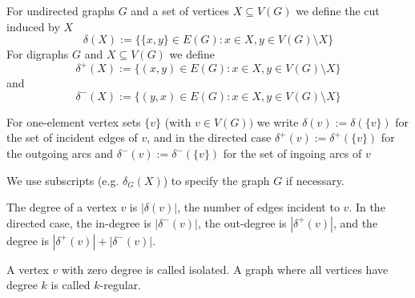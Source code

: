 % 
\begin{definition}
For undirected graphs $G$ and a set of vertices $X \subseteq V(G)$ we define the cut induced by $X$
$$\delta(X) := \{\{x, y\} \in E(G) : x \in X , y \in V(G) \setminus X\}$$
For digraphs $G$ and $X \subseteq V(G)$ we define 
$$\delta^+(X) := \{(x, y) \in E(G) : x \in X , y \in V(G) \setminus X\}$$ and
$$\delta^-(X) := \{(y, x) \in E(G) : x \in X , y \in V(G) \setminus X\}$$
 
For one-element vertex sets $\{v\}$ (with $v \in V(G))$ we write $\delta(v) :=\delta(\{v\})$ for the set of incident 
edges of $v$, and in the directed case 
$ \delta^+(v) := \delta^+(\{v\})$ for the outgoing arcs and $\delta^-(v) := \delta^-(\{v\})$ for the set of ingoing 
arcs of $v$
\end{definition}
We use subscripts (e.g. $\delta_G(X)$) to specify the graph $G$ if necessary.
\begin{definition}
The degree of a vertex $v$ is $|\delta(v)|$, the number of edges incident to $v$. In the directed 
case, the in-degree is $|\delta^-(v)|$, the out-degree is $|\delta^+(v)|$, and the degree is 
$|\delta^+(v)|+ |\delta^-(v)|$.
\end{definition}
A vertex $v$ with zero degree is called isolated. A graph where all vertices have degree $k$ is called $k$-regular.

